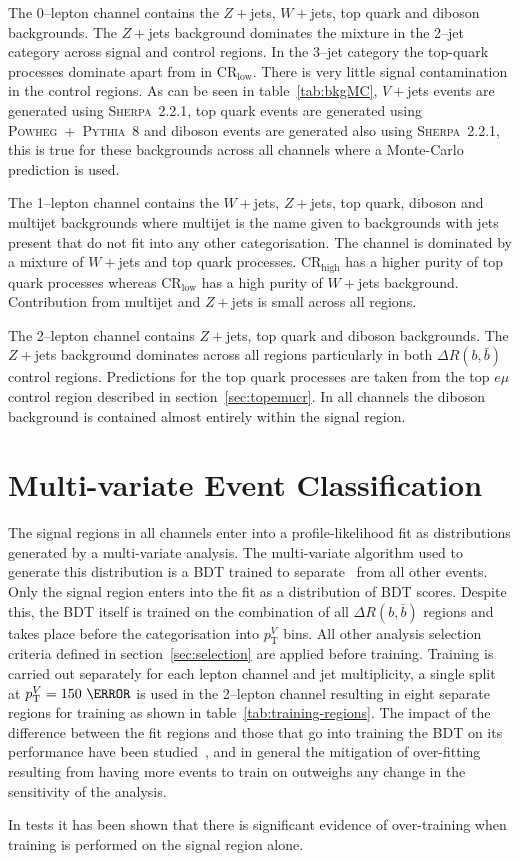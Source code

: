 The 0--lepton channel contains the $Z + $jets, $W+$jets, top quark and diboson
backgrounds. The $Z+$jets background dominates the mixture in the 2--jet
category across signal and control regions. In the 3--jet category the top-quark
processes dominate apart from in CR$_{\text{low}}$. There is very little signal
contamination in the control regions. As can be seen in table~\ref{tab:bkgMC},
$V+$jets events are generated using \textsc{Sherpa~2.2.1}, top quark events are
generated using \textsc{Powheg}~+~\textsc{Pythia~8} and diboson events are
generated also using \textsc{Sherpa~2.2.1}, this is true for these backgrounds
across all channels where a Monte-Carlo prediction is used.


The 1--lepton channel contains the $W+$jets, $Z+$jets, top quark, diboson and
multijet backgrounds where multijet is the name given to backgrounds with jets
present that do not fit into any other categorisation. The channel is dominated
by a mixture of $W+$jets and top quark processes. CR$_{\text{high}}$ has a
higher purity of top quark processes whereas CR$_{\text{low}}$ has a high purity
of $W+$jets background. Contribution from multijet and $Z+$jets is small across
all regions.

The 2--lepton channel contains $Z+$jets, top quark and diboson backgrounds. The
$Z+$jets background dominates across all regions particularly in both $\Delta
R(b, \bar{b})$ control regions. Predictions for the top quark processes are
taken from the top $e \mu$ control region described in
section~\ref{sec:topemucr}. In all channels the diboson background is contained
almost entirely within the signal region.

\section{Multi-variate Event Classification}%
\label{sec:mva}

The signal regions in all channels enter into a profile-likelihood fit as
distributions generated by a multi-variate analysis. The multi-variate algorithm
used to generate this distribution is a BDT trained to separate \VHbb\ from all
other events. Only the signal region enters into the fit as a distribution of
BDT scores. Despite this, the BDT itself is trained on the combination of all
$\Delta R(b, \bar{b})$ regions and takes place before the categorisation into
$p_{\mathrm{T}}^V$ bins. All other analysis selection criteria defined in
section~\ref{sec:selection} are applied before training. Training is carried out
separately for each lepton channel and jet multiplicity, a single split at
$p_{\mathrm{T}}^V=150~\GeV$ is used in the 2--lepton channel resulting in eight
separate regions for training as shown in table~\ref{tab:training-regions}. The
impact of the difference between the fit regions and those that go into training
the BDT on its performance have been studied~\cite{VHMainNote2019}, and in
general the mitigation of over-fitting resulting from having more events to
train on outweighs any change in the sensitivity of the analysis.

In tests it has been shown that there is significant evidence of over-training
when training is performed on the signal region alone.

